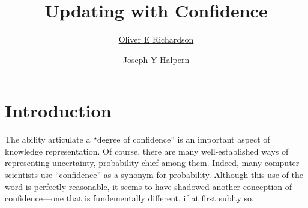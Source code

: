 \documentclass{uai2022} %
\title{Updating with Confidence}
\author[1]{\href{mailto:<oer5@cornell.edu>?Subject=Confidence}{Oliver E Richardson}{}}
\author[1]{Joseph Y Halpern}
\affil[1]{%
    Computer Science Dept.\\
    Cornell University\\
    Ithaca, New York, USA
}
\begin{document}
\maketitle

\begin{abstract}
 
\end{abstract}

\section{Introduction}\label{sec:intro}

\def\stmt{$A$}


The ability articulate a ``degree of confidence'' is an important aspect of knowledge representation.
Of course, there are many well-established ways of representing uncertainty,
	probability chief among them.
Indeed, many computer scientists use ``confidence'' as a synonym for probability.
Although this use of the word is perfectly reasonable, it seems to have shadowed another conception of confidence---one that is fundementally different, if at first sublty so. 
 
\end{document}
